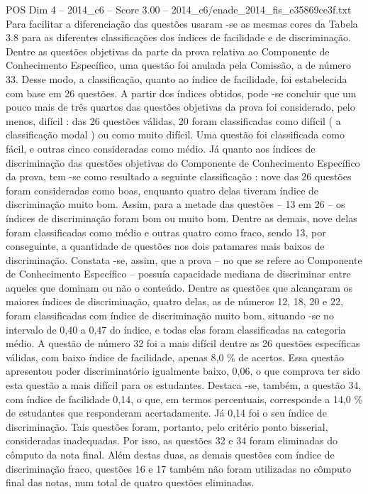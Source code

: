 \begin{textsample}{POS Dim 4 – 2014\_c6 – Score 3.00 – 2014\_c6/enade\_2014\_fis\_e35869ce3f.txt}
Para facilitar a diferenciação das questões usaram -se as mesmas cores da Tabela 3.8 para as diferentes classificações dos índices de facilidade e de discriminação.
Dentre as questões objetivas da parte da prova relativa ao Componente de Conhecimento Específico, uma questão foi anulada pela Comissão, a de número 33.
Desse modo, a classificação, quanto ao índice de facilidade, foi estabelecida com base em 26 questões.
A partir dos índices obtidos, pode -se concluir que um pouco mais de três quartos das questões objetivas da prova foi considerado, pelo menos, difícil : das 26 questões válidas, 20 foram classificadas como difícil ( a classificação modal ) ou como muito difícil.
Uma questão foi classificada como fácil, e outras cinco consideradas como médio.
Já quanto aos índices de discriminação das questões objetivas do Componente de Conhecimento Específico da prova, tem -se como resultado a seguinte classificação : nove das 26 questões foram consideradas como boas, enquanto quatro delas tiveram índice de discriminação muito bom.
Assim, para a metade das questões – 13 em 26 – os índices de discriminação foram bom ou muito bom.
Dentre as demais, nove delas foram classificadas como médio e outras quatro como fraco, sendo 13, por conseguinte, a quantidade de questões nos dois patamares mais baixos de discriminação.
Constata -se, assim, que a prova – no que se refere ao Componente de Conhecimento Específico – possuía capacidade mediana de discriminar entre aqueles que dominam ou não o conteúdo.
Dentre as questões que alcançaram os maiores índices de discriminação, quatro delas, as de números 12, 18, 20 e 22, foram classificadas com índice de discriminação muito bom, situando -se no intervalo de 0,40 a 0,47 do índice, e todas elas foram classificadas na categoria médio.
A questão de número 32 foi a mais difícil dentre as 26 questões específicas válidas, com baixo índice de facilidade, apenas 8,0 \% de acertos.
Essa questão apresentou poder discriminatório igualmente baixo, 0,06, o que comprova ter sido esta questão a mais difícil para os estudantes.
Destaca -se, também, a questão 34, com índice de facilidade 0,14, o que, em termos percentuais, corresponde a 14,0 \% de estudantes que responderam acertadamente.
Já 0,14 foi o seu índice de discriminação.
Tais questões foram, portanto, pelo critério ponto bisserial, consideradas inadequadas.
Por isso, as questões 32 e 34 foram eliminadas do cômputo da nota final.
Além destas duas, as demais questões com índice de discriminação fraco, questões 16 e 17 também não foram utilizadas no cômputo final das notas, num total de quatro questões eliminadas.

\end{textsample}

